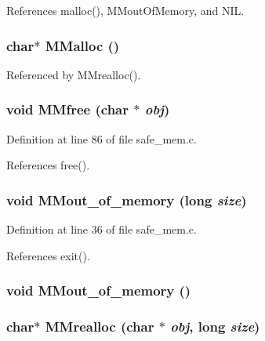 References malloc(), MMout\-Of\-Memory, and NIL.
\subsubsection{\setlength{\rightskip}{0pt plus 5cm}char$\ast$ MMalloc ()}\label{safe__mem_8c_0e72bd1abed3db2ba54e44acffe09f58}




Referenced by MMrealloc().
\subsubsection{\setlength{\rightskip}{0pt plus 5cm}void MMfree (char $\ast$ {\em obj})}\label{safe__mem_8c_c59f5c7721904a15919572ee69995623}




Definition at line 86 of file safe\_\-mem.c.

References free().
\subsubsection{\setlength{\rightskip}{0pt plus 5cm}void MMout\_\-of\_\-memory (long {\em size})}\label{safe__mem_8c_fdefaee4aec8c354a2b1bfddc6728205}




Definition at line 36 of file safe\_\-mem.c.

References exit().
\subsubsection{\setlength{\rightskip}{0pt plus 5cm}void MMout\_\-of\_\-memory ()}\label{safe__mem_8c_3cc3f211bc6300584ddb3134f1f9d8e8}


\subsubsection{\setlength{\rightskip}{0pt plus 5cm}char$\ast$ MMrealloc (char $\ast$ {\em obj}, long {\em size})}\label{safe__mem_8c_1b107b7524e7b1af372b5d1dac28cdb8}




